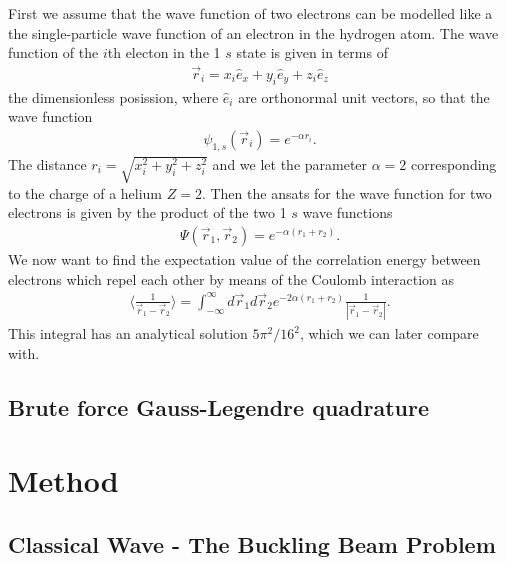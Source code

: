 \documentclass[twocolumn]{aastex62}
\begin{document}
First we assume that the wave function of two electrons can be modelled like a the single-particle wave function of an electron in the hydrogen atom. The wave function of the $i$th electon in the 1 $s$ state is given in terms of
\begin{align}
	\vec{r}_i = x_i \hat{e}_x + y_i\hat{e}_y + z_i\hat{e}_z
\end{align} 
the dimensionless posission, where $\hat{e}_i$ are orthonormal unit vectors, so that the wave function
\begin{align}
	\psi_{1,s}(\vec{r}_i) = e^{-\alpha r_i}.
\end{align}
The distance $r_i = \sqrt{x_i^2 + y_i^2 + z_i^2}$ and we let the parameter $\alpha = 2$ corresponding to the charge of a helium $Z = 2$. Then the ansats for the wave function for two electrons is given by the product of the two 1 $s$ wave functions 
\begin{align}
	\Psi(\vec{r}_1, \vec{r}_2) = e^{-\alpha(r_1 + r_2)}.
\end{align}
We now want to find the expectation value of the correlation energy between electrons which repel each other by means of the Coulomb interaction as 
\begin{align}
\label{eq:cartint}
\langle \frac{
1}{\vec{r}_1 - \vec{r}_2}\rangle = \int^\infty_{-\infty} d\vec{r}_1d\vec{r}_2 e^{-2\alpha(r_1 + r_2)}\frac{1}{|\vec{r}_1 - \vec{r}_2|}.
\end{align}
This integral has an analytical solution $5\pi^2/16^2$, which we can later compare with.
\subsection{Brute force Gauss-Legendre quadrature}


\section{Method} \label{sec:method}
\subsection{Classical Wave - The Buckling Beam Problem}
\end{document}

